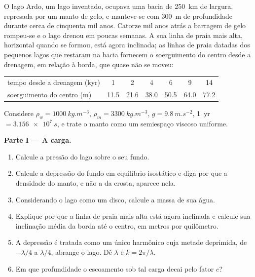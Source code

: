 \begin{problem}
\label{pb:b3:mantle-convection:1}
O lago Ardo, um lago inventado, ocupava uma bacia de \qty{250}{km} de largura, represada por um
manto de gelo, e manteve-se com \qty{300}{m} de profundidade durante cerca de cinquenta mil anos. Catorze
mil anos atrás a barragem de gelo rompeu-se e o lago drenou em poucas semanas. A sua
linha de praia mais alta, horizontal quando se formou, está agora inclinada; as linhas de praia datadas
dos pequenos lagos que restaram na bacia fornecem o soerguimento do centro desde a
drenagem, em relação à borda, que quase não se moveu:

\smallskip
\begin{center}\small
\begin{tabular}{lcccccc}
\hline
tempo desde a drenagem (kyr) & 1 & 2 & 4 & 6 & 9 & 14\\
soerguimento do centro (m) & 11.5 & 21.6 & 38.0 & 50.5 & 64.0 & 77.2\\
\hline
\end{tabular}
\end{center}
\smallskip

Considere $\rho_w = \qty{1000}{kg.m^{-3}}$, $\rho_m = \qty{3300}{kg.m^{-3}}$, $g =
\qty{9.8}{m.s^{-2}}$, \qty{1}{yr} $= \qty{3.156e7}{s}$, e trate o manto como
um semiespaço viscoso uniforme.

\medskip\noindent\textbf{Parte I --- A carga.}
\begin{enumerate}
  \item Calcule a pressão do lago sobre o seu fundo.
  \item Calcule a depressão do fundo em equilíbrio isostático e diga
        por que a densidade do manto, e não a da crosta, aparece nela.
  \item Considerando o lago como um disco, calcule a massa de sua água.
  \item Explique por que a linha de praia mais alta está agora inclinada e calcule sua
        inclinação média da borda até o centro, em metros por quilômetro.
  \item A depressão é tratada como um único harmônico cuja metade deprimida, de
        $-\lambda/4$ a $\lambda/4$, abrange o lago. Dê $\lambda$ e $k =
        2\pi/\lambda$.
  \item Em que profundidade o escoamento sob tal carga decai pelo fator
        $e$?
\end{enumerate}


\end{problem}
